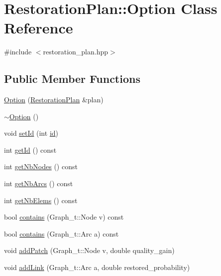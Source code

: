 \hypertarget{class_restoration_plan_1_1_option}{}\section{Restoration\+Plan\+:\+:Option Class Reference}
\label{class_restoration_plan_1_1_option}


{\ttfamily \#include $<$restoration\+\_\+plan.\+hpp$>$}

\subsection*{Public Member Functions}
\begin{DoxyCompactItemize}
\item 
\hyperlink{class_restoration_plan_1_1_option_a4b7de810dc136d3f1b7b59b540e3ab14}{Option} (\hyperlink{class_restoration_plan}{Restoration\+Plan} \&plan)
\item 
\hyperlink{class_restoration_plan_1_1_option_a17c9e40390e7941a3a0c8ed7141368d0}{$\sim$\+Option} ()
\item 
void \hyperlink{class_restoration_plan_1_1_option_a2434271320cdaf7976da04226a8f208b}{set\+Id} (int \hyperlink{class_restoration_plan_1_1_option_a9f520746b161200657579a6129cbcce4}{id})
\item 
int \hyperlink{class_restoration_plan_1_1_option_a0e878ed51e916cd12e13ce7fd05fad97}{get\+Id} () const
\item 
int \hyperlink{class_restoration_plan_1_1_option_aad1504a5146f0d1428c2a1870191e9c9}{get\+Nb\+Nodes} () const
\item 
int \hyperlink{class_restoration_plan_1_1_option_a7e460f4f101387b3ab489e3d87781a18}{get\+Nb\+Arcs} () const
\item 
int \hyperlink{class_restoration_plan_1_1_option_a593c37bd6a3243b24a254cf76ba43740}{get\+Nb\+Elems} () const
\item 
bool \hyperlink{class_restoration_plan_1_1_option_a33732229ec8a18047c2c5fd2ab46f63f}{contains} (Graph\+\_\+t\+::\+Node v) const
\item 
bool \hyperlink{class_restoration_plan_1_1_option_a61e1263cd6baa63be17b39bcfc8d6228}{contains} (Graph\+\_\+t\+::\+Arc a) const
\item 
void \hyperlink{class_restoration_plan_1_1_option_a65c8bad73ea738fa9aa3e20800ae2e5a}{add\+Patch} (Graph\+\_\+t\+::\+Node v, double quality\+\_\+gain)
\item 
void \hyperlink{class_restoration_plan_1_1_option_ac6dedad7776f2fe6fb605ed608d5646b}{add\+Link} (Graph\+\_\+t\+::\+Arc a, double restored\+\_\+probability)

\end{DoxyCompactItemize}
